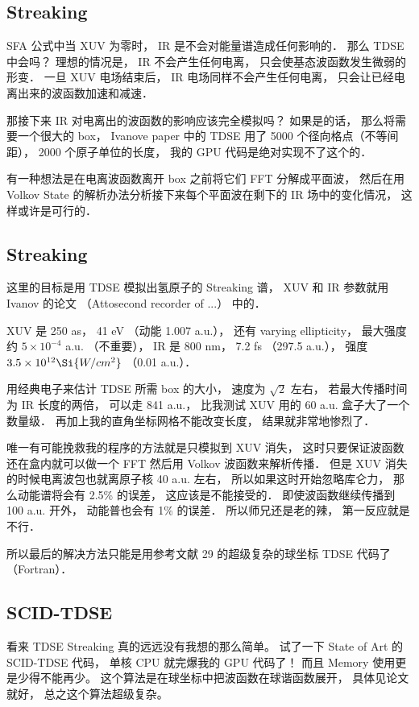 \subsection{Streaking}
SFA 公式中当 XUV 为零时， IR 是不会对能量谱造成任何影响的． 那么 TDSE 中会吗？ 理想的情况是， IR 不会产生任何电离， 只会使基态波函数发生微弱的形变． 一旦 XUV 电场结束后， IR 电场同样不会产生任何电离， 只会让已经电离出来的波函数加速和减速．

那接下来 IR 对电离出的波函数的影响应该完全模拟吗？ 如果是的话， 那么将需要一个很大的 box， Ivanove paper 中的 TDSE 用了 5000 个径向格点（不等间距）， 2000 个原子单位的长度， 我的 GPU 代码是绝对实现不了这个的．

有一种想法是在电离波函数离开 box 之前将它们 FFT 分解成平面波， 然后在用 Volkov State 的解析办法分析接下来每个平面波在剩下的 IR 场中的变化情况， 这样或许是可行的．


\subsection{Streaking}
这里的目标是用 TDSE 模拟出氢原子的 Streaking 谱， XUV 和 IR 参数就用 Ivanov 的论文 （Attosecond recorder of ...） 中的．

XUV 是 250 as， 41 eV （动能 1.007 a.u.）， 还有 varying ellipticity， 最大强度约 $5\times 10^{-4}$ a.u. （不重要）， IR 是 800 nm， 7.2 fs （297.5 a.u.）， 强度 $3.5\times 10^{12} \Si{W/cm^2}$ （0.01 a.u.）．

用经典电子来估计 TDSE 所需 box 的大小， 速度为 $\sqrt{2}$ 左右， 若最大传播时间为 IR 长度的两倍， 可以走 841 a.u.， 比我测试 XUV 用的 60 a.u. 盒子大了一个数量级． 再加上我的直角坐标网格不能改变长度， 结果就非常地惨烈了．

唯一有可能挽救我的程序的方法就是只模拟到 XUV 消失， 这时只要保证波函数还在盒内就可以做一个 FFT 然后用 Volkov 波函数来解析传播． 但是 XUV 消失的时候电离波包也就离原子核 40 a.u. 左右， 所以如果这时开始忽略库仑力， 那么动能谱将会有 2.5\% 的误差， 这应该是不能接受的． 即使波函数继续传播到 100 a.u. 开外， 动能普也会有 1\% 的误差． 所以师兄还是老的辣， 第一反应就是不行．

所以最后的解决方法只能是用参考文献 29 的超级复杂的球坐标 TDSE 代码了（Fortran）．

\subsection{SCID-TDSE}
看来 TDSE Streaking 真的远远没有我想的那么简单。 试了一下 State of Art 的 SCID-TDSE 代码， 单核 CPU 就完爆我的 GPU 代码了！ 而且 Memory 使用更是少得不能再少。 这个算法是在球坐标中把波函数在球谐函数展开， 具体见论文就好， 总之这个算法超级复杂。


